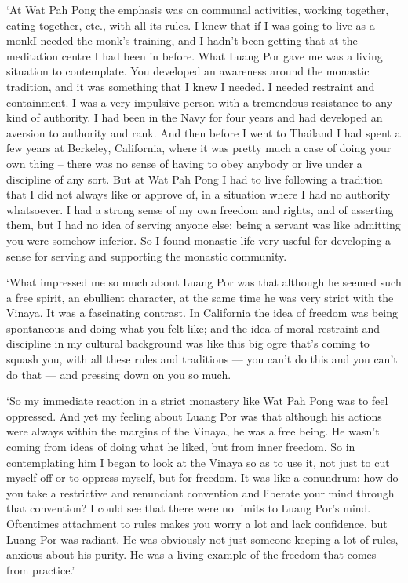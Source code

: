 `At Wat Pah Pong the emphasis was on communal activities, working
together, eating together, etc., with all its rules. I knew that if I
was going to live as a monkI needed the monk's training, and I hadn't
been getting that at the meditation centre I had been in before. What
Luang Por gave me was a living situation to contemplate. You developed
an awareness around the monastic tradition, and it was something that I
knew I needed. I needed restraint and containment. I was a very
impulsive person with a tremendous resistance to any kind of authority.
I had been in the Navy for four years and had developed an aversion to
authority and rank. And then before I went to Thailand I had spent a few
years at Berkeley, California, where it was pretty much a case of doing
your own thing -- there was no sense of having to obey anybody or live
under a discipline of any sort. But at Wat Pah Pong I had to live
following a tradition that I did not always like or approve of, in a
situation where I had no authority whatsoever. I had a strong sense of
my own freedom and rights, and of asserting them, but I had no idea of
serving anyone else; being a servant was like admitting you were somehow
inferior. So I found monastic life very useful for developing a sense
for serving and supporting the monastic community.

`What impressed me so much about Luang Por was that although he seemed
such a free spirit, an ebullient character, at the same time he was very
strict with the Vinaya. It was a fascinating contrast. In California the
idea of freedom was being spontaneous and doing what you felt like; and
the idea of moral restraint and discipline in my cultural background was
like this big ogre that's coming to squash you, with all these rules and
traditions --- you can't do this and you can't do that --- and pressing
down on you so much.

`So my immediate reaction in a strict monastery like Wat Pah Pong was to
feel oppressed. And yet my feeling about Luang Por was that although his
actions were always within the margins of the Vinaya, he was a free
being. He wasn't coming from ideas of doing what he liked, but from
inner freedom. So in contemplating him I began to look at the Vinaya so
as to use it, not just to cut myself off or to oppress myself, but for
freedom. It was like a conundrum: how do you take a restrictive and
renunciant convention and liberate your mind through that convention? I
could see that there were no limits to Luang Por's mind. Oftentimes
attachment to rules makes you worry a lot and lack confidence, but Luang
Por was radiant. He was obviously not just someone keeping a lot of
rules, anxious about his purity. He was a living example of the freedom
that comes from practice.'

